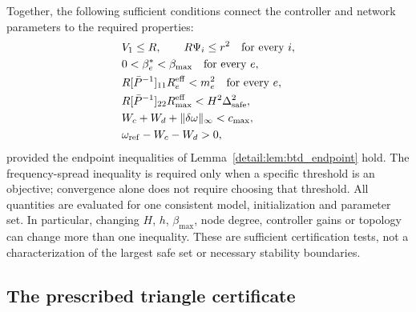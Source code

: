Together, the following sufficient conditions connect the controller
and network parameters to the required properties:
\begin{align}
 &V_1\le R,\qquad R\Psi_i\le r^2\quad\text{for every }i,\nonumber\\
 &0<\beta_e^*<\beta_{\max}\quad\text{for every }e,\nonumber\\
 &R[\bar P^{-1}]_{11}R_e^{\rm eff}<m_e^2
       \quad\text{for every }e,\nonumber\\
 &R[\bar P^{-1}]_{22}R_{\max}^{\rm eff}
       <H^2\Delta_{\rm safe}^2,\nonumber\\
 &W_c+W_d+\|\delta\omega\|_\infty<c_{\max},\nonumber\\
 &\omega_{\rm ref}-W_c-W_d>0,
 \label{detail:eq:btd_joint_sufficient_conditions}
\end{align}
provided the endpoint inequalities of Lemma~\ref{detail:lem:btd_endpoint} hold.
The frequency-spread inequality is required only when a specific threshold
is an objective; convergence alone does not require choosing that threshold.
All quantities are evaluated for one consistent model, initialization
and parameter set. In particular, changing $H$, $h$, $\beta_{\max}$, node degree,
controller gains or topology can change more than one inequality.
These are sufficient certification tests, not a characterization of the
largest safe set or necessary stability boundaries.

\subsection{The prescribed triangle certificate}

